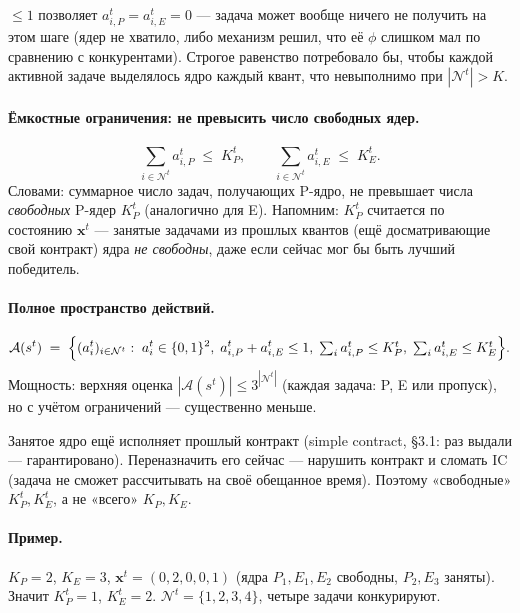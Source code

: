 \documentclass[11pt,a4paper]{article}
\begin{document}
\begin{why}[Почему не $=1$, а $\leq 1$]
$\leq 1$ позволяет $a_{i,P}^t=a_{i,E}^t=0$ — задача может вообще
ничего не получить на этом шаге (ядер не хватило, либо механизм
решил, что её $\phi$ слишком мал по сравнению с конкурентами).
Строгое равенство потребовало бы, чтобы каждой активной задаче
выделялось ядро каждый квант, что невыполнимо при
$|\mathcal{N}^t|>K$.
\end{why}

\paragraph{Ёмкостные ограничения: не превысить число свободных ядер.}
\[
\sum_{i\in\mathcal{N}^t} a_{i,P}^t \;\leq\; K_P^t, \qquad
\sum_{i\in\mathcal{N}^t} a_{i,E}^t \;\leq\; K_E^t.
\]
Словами: суммарное число задач, получающих P-ядро, не превышает
числа \emph{свободных} P-ядер $K_P^t$ (аналогично для E).
Напомним: $K_P^t$ считается по состоянию $\mathbf{x}^t$ —
занятые задачами из прошлых квантов (ещё досматривающие свой
контракт) ядра \emph{не свободны}, даже если сейчас мог бы быть
лучший победитель.

\paragraph{Полное пространство действий.}
\[
\mathcal{A}(s^t) \;=\;
\Bigl\{(a_i^t)_{i\in\mathcal{N}^t} :\;
  a_i^t\in\{0,1\}^2,\;
  a_{i,P}^t+a_{i,E}^t\leq 1,\;
  \textstyle\sum_i a_{i,P}^t\leq K_P^t,\;
  \sum_i a_{i,E}^t\leq K_E^t
\Bigr\}.
\]
Мощность: верхняя оценка $|\mathcal{A}(s^t)|\leq 3^{|\mathcal{N}^t|}$
(каждая задача: P, E или пропуск), но с учётом ограничений —
существенно меньше.

\begin{why}
Занятое ядро ещё исполняет прошлый контракт (simple contract,
§3.1: раз выдали — гарантировано). Переназначить его сейчас —
нарушить контракт и сломать IC (задача не сможет рассчитывать
на своё обещанное время). Поэтому «свободные» $K_P^t,K_E^t$, а не
«всего» $K_P,K_E$.
\end{why}

\paragraph{Пример.}
$K_P=2$, $K_E=3$, $\mathbf{x}^t=(0,2,0,0,1)$ (ядра $P_1,E_1,E_2$
свободны, $P_2,E_3$ заняты). Значит $K_P^t=1$, $K_E^t=2$.
$\mathcal{N}^t=\{1,2,3,4\}$, четыре задачи конкурируют.
\end{document}

